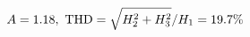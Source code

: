 \documentclass[preview]{standalone}
\begin{document}
\begin{align*}
\special{dvisvgm:raw <g id='unique000'>}A=1.18,\ \text{THD}=\sqrt{H_2^2+H_3^2}/H_1=19.7\%\special{dvisvgm:raw </g>}
\end{align*}
\end{document}
